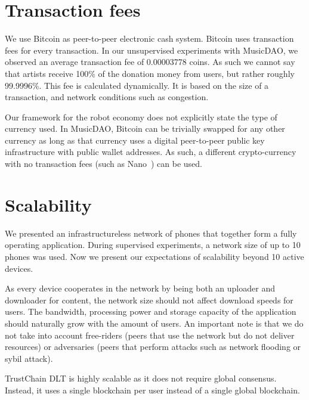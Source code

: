 \section{Transaction fees}
We use Bitcoin as peer-to-peer electronic cash system. Bitcoin uses transaction fees for every transaction. In our unsupervised experiments with MusicDAO, we observed an average transaction fee of 0.00003778 coins. As such we cannot say that artists receive 100\% of the donation money from users, but rather roughly 99.9996\%. This fee is calculated dynamically. It is based on the size of a transaction, and network conditions such as congestion. 

Our framework for the robot economy does not explicitly state the type of currency used. In MusicDAO, Bitcoin can be trivially swapped for any other currency as long as that currency uses a digital peer-to-peer public key infrastructure with public wallet addresses. As such, a different crypto-currency with no transaction fees (such as Nano~\citep{lemahieu2018nano}) can be used.

\section{Scalability}
We presented an infrastructureless network of phones that together form a fully operating application. During supervised experiments, a network size of up to 10 phones was used. Now we present our expectations of scalability beyond 10 active devices. 

As every device cooperates in the network by being both an uploader and downloader for content, the network size should not affect download speeds for users. The bandwidth, processing power and storage capacity of the application should naturally grow with the amount of users. An important note is that we do not take into account free-riders (peers that use the network but do not deliver resources) or adversaries (peers that perform attacks such as network flooding or sybil attack).

TrustChain DLT is highly scalable as it does not require global consensus. Instead, it uses a single blockchain per user instead of a single global blockchain. 



